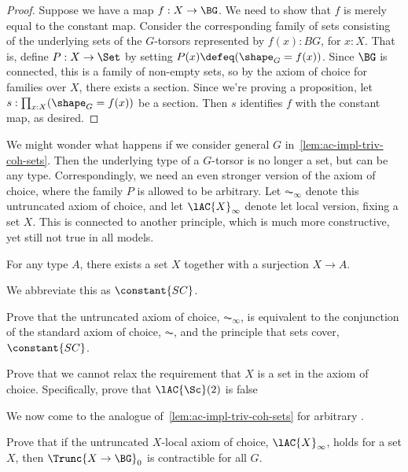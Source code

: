 \begin{proof}
  Suppose we have a map $f : X \to \BG$.
  We need to show that $f$ is merely equal to the constant map.
  Consider the corresponding family of sets
  consisting of the underlying sets of the $G$-torsors represented by
  $f(x) : BG$, for $x:X$.
  That is, define $P : X \to \Set$ by setting $P(x) \defeq (\shape_G = f(x))$.
  Since $\BG$ is connected, this is a family of non-empty sets,
  so by the axiom of choice for families over $X$,
  there exists a section.
  Since we're proving a proposition, let $s : \prod_{x:X}(\shape_G = f(x))$
  be a section.
  Then $s$ identifies $f$ with the constant map, as desired.
\end{proof}

We might wonder what happens if we consider general \inftygps $G$
in~\cref{lem:ac-impl-triv-coh-sets}.
Then the underlying type of a $G$-torsor is no longer a set, but can be any type.
Correspondingly, we need an even stronger version of the axiom of choice,
where the family $P$ is allowed to be arbitrary.
Let $\AC_\infty$ denote this untruncated axiom of choice,
and let $\lAC{X}_\infty$ denote let local version, fixing a set $X$.
This is connected to another principle, which is much more constructive,
yet still not true in all models.

\begin{principle}\label{pri:sc}
  For any type $A$, there exists a set $X$ together with a surjection $X \to A$.
\end{principle}

We abbreviate this as $\constant{SC}$.

\begin{xca}
  Prove that the untruncated axiom of choice, $\AC_\infty$,
  is equivalent to the conjunction of the standard axiom of choice, $\AC$,
  and the principle that sets cover, $\constant{SC}$.
\end{xca}

\begin{xca}
  Prove that we cannot relax the requirement that $X$ is a set
  in the axiom of choice.
  Specifically, prove that $\lAC{\Sc}(2)$ is false
\end{xca}

We now come to the analogue of~\cref{lem:ac-impl-triv-coh-sets}
for arbitrary \inftygps.

\begin{xca}
  Prove that if the untruncated $X$-local axiom of choice, $\lAC{X}_\infty$,
  holds for a set $X$,
  then $\Trunc{X \to \BG}_0$ is contractible for all \inftygps $G$.
\end{xca}

